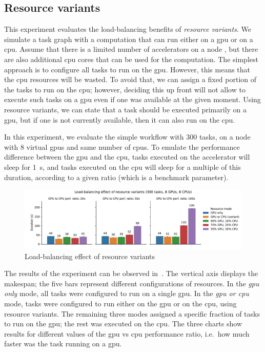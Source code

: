 \subsection{Resource variants}
\label{sec:hq-exp-resource-variants}
This experiment evaluates the load-balancing benefits of \emph{resource variants}. We simulate a
task graph with a computation that can run either on a \gls{gpu} or on a
\gls{cpu}. Assume that there is a limited number of accelerators on a node , but
there are also additional \gls{cpu} cores that can be used for the computation. The
simplest approach is to configure all tasks to run on the \gls{gpu}. However, this
means that the \gls{cpu} resources will be wasted. To avoid that, we can assign a
fixed portion of the tasks to run on the \gls{cpu}; however, deciding this up front
will not allow \hyperqueue{} to execute such tasks on a \gls{gpu} even if
one was available at the given moment. Using resource variants, we can state that a task should be
executed primarily on a \gls{gpu}, but if one is not currently available, then it can
also run on the \gls{cpu}.

In this experiment, we evaluate the simple workflow with $300$ tasks, on a node
with $8$ virtual \glspl{gpu} and same number of
\glspl{cpu}. To emulate the performance difference between the \gls{gpu}
and the \gls{cpu}, tasks executed on the accelerator will sleep for
\SI{1}{\second}, and tasks executed on the \gls{cpu} will sleep for a
multiple of this duration, according to a given ratio (which is a benchmark parameter).

\begin{figure}[h]
	\centering
	\includegraphics[width=\textwidth]{imgs/hq/charts/alternative-resources}
	\caption{Load-balancing effect of resource variants}
	\label{fig:hq-resource-variants}
\end{figure}

The results of the experiment can be observed in~. The vertical axis
displays the makespan; the five bars represent different configurations of resources. In the
\emph{\gls{gpu} only} mode, all tasks were configured to run on a single \gls{gpu}.
In the \emph{\gls{gpu} or \gls{cpu}} mode, tasks were configured to run either on the
\gls{gpu} or on the \gls{cpu}, using resource variants. The remaining
three modes assigned a specific fraction of tasks to run on the \gls{gpu}; the rest
was executed on the \gls{cpu}. The three charts show results for different values of
the \gls{gpu} vs \gls{cpu} performance ratio, i.e.\ how much faster was
the task running on a \gls{gpu}.

